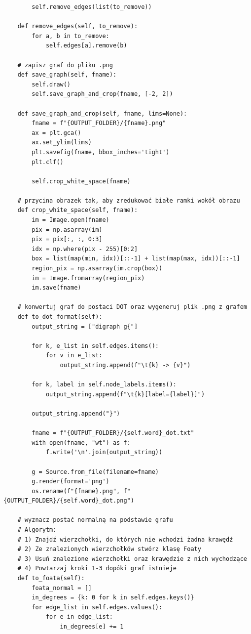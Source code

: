 \documentclass[12pt]{article}
\begin{document}
\begin{verbatim}
        self.remove_edges(list(to_remove))

    def remove_edges(self, to_remove):
        for a, b in to_remove:
            self.edges[a].remove(b)

    # zapisz graf do pliku .png
    def save_graph(self, fname):
        self.draw()
        self.save_graph_and_crop(fname, [-2, 2])

    def save_graph_and_crop(self, fname, lims=None):
        fname = f"{OUTPUT_FOLDER}/{fname}.png"
        ax = plt.gca()
        ax.set_ylim(lims)
        plt.savefig(fname, bbox_inches='tight')
        plt.clf()

        self.crop_white_space(fname)

    # przycina obrazek tak, aby zredukować białe ramki wokół obrazu
    def crop_white_space(self, fname):
        im = Image.open(fname)
        pix = np.asarray(im)
        pix = pix[:, :, 0:3]
        idx = np.where(pix - 255)[0:2]
        box = list(map(min, idx))[::-1] + list(map(max, idx))[::-1]
        region_pix = np.asarray(im.crop(box))
        im = Image.fromarray(region_pix)
        im.save(fname)

    # konwertuj graf do postaci DOT oraz wygeneruj plik .png z grafem
    def to_dot_format(self):
        output_string = ["digraph g{"]

        for k, e_list in self.edges.items():
            for v in e_list:
                output_string.append(f"\t{k} -> {v}")

        for k, label in self.node_labels.items():
            output_string.append(f"\t{k}[label={label}]")

        output_string.append("}")

        fname = f"{OUTPUT_FOLDER}/{self.word}_dot.txt"
        with open(fname, "wt") as f:
            f.write('\n'.join(output_string))

        g = Source.from_file(filename=fname)
        g.render(format='png')
        os.rename(f"{fname}.png", f"{OUTPUT_FOLDER}/{self.word}_dot.png")

    # wyznacz postać normalną na podstawie grafu
    # Algorytm:
    # 1) Znajdź wierzchołki, do których nie wchodzi żadna krawędź
    # 2) Ze znalezionych wierzchołków stwórz klasę Foaty
    # 3) Usuń znalezione wierzchołki oraz krawędzie z nich wychodzące
    # 4) Powtarzaj kroki 1-3 dopóki graf istnieje
    def to_foata(self):
        foata_normal = []
        in_degrees = {k: 0 for k in self.edges.keys()}
        for edge_list in self.edges.values():
            for e in edge_list:
                in_degrees[e] += 1


\end{verbatim}
\end{document}
